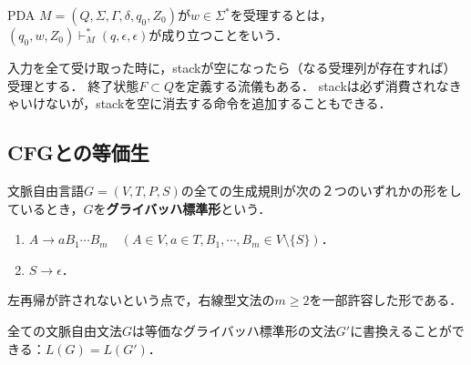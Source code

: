 \documentclass[uplatex, dvipdfmx]{jsreport}
\begin{document}
\begin{definition}[受理条件]
    PDA $M=(Q,\Sigma,\Gamma,\delta,q_0,Z_0)$が$w\in\Sigma^*$を受理するとは，$(q_0,w,Z_0)\vdash^*_M(q,\epsilon,\epsilon)$が成り立つことをいう．
\end{definition}
\begin{remarks}
    入力を全て受け取った時に，stackが空になったら（なる受理列が存在すれば）受理とする．
    終了状態$F\subset Q$を定義する流儀もある．
    stackは必ず消費されなきゃいけないが，stackを空に消去する命令を追加することもできる．
\end{remarks}

\subsection{CFGとの等価生}

\begin{definition}
    文脈自由言語$G=(V,T,P,S)$の全ての生成規則が次の２つのいずれかの形をしているとき，$G$を\textbf{グライバッハ標準形}という．
    \begin{enumerate}
        \item $A\to aB_1\cdots B_m\quad(A\in V,a\in T,B_1,\cdots,B_m\in V\setminus\{S\})$．
        \item $S\to\epsilon$．
    \end{enumerate}
    左再帰が許されないという点で，右線型文法の$m\ge 2$を一部許容した形である．
\end{definition}

\begin{theorem}[Greibach]\label{thm-Greibach-normal-form}
    全ての文脈自由文法$G$は等価なグライバッハ標準形の文法$G'$に書換えることができる：$L(G)=L(G')$．
\end{theorem}
\end{document}
